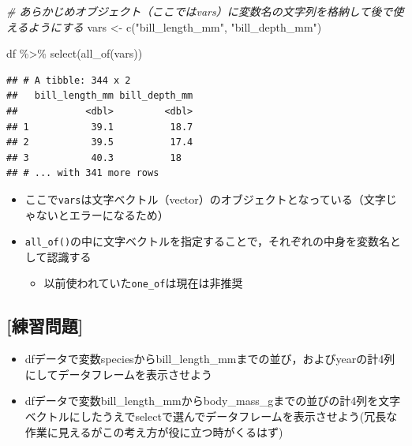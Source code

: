\documentclass[
  xelatex,ja=standard, b5paper]{bxjsbook}
\newenvironment{Shaded}{\begin{snugshade}}{\end{snugshade}}
\newcommand{\CommentTok}[1]{\textcolor[rgb]{0.56,0.35,0.01}{\textit{#1}}}
\newcommand{\FunctionTok}[1]{\textcolor[rgb]{0.00,0.00,0.00}{#1}}
\newcommand{\NormalTok}[1]{#1}
\newcommand{\OtherTok}[1]{\textcolor[rgb]{0.56,0.35,0.01}{#1}}
\newcommand{\SpecialCharTok}[1]{\textcolor[rgb]{0.00,0.00,0.00}{#1}}
\newcommand{\StringTok}[1]{\textcolor[rgb]{0.31,0.60,0.02}{#1}}
\providecommand{\tightlist}{%
  \setlength{\itemsep}{0pt}\setlength{\parskip}{0pt}}
\begin{document}
\begin{Shaded}
\begin{Highlighting}[]
\CommentTok{\# あらかじめオブジェクト（ここではvars）に変数名の文字列を格納して後で使えるようにする}
\NormalTok{vars }\OtherTok{\textless{}{-}} \FunctionTok{c}\NormalTok{(}\StringTok{"bill\_length\_mm"}\NormalTok{, }\StringTok{"bill\_depth\_mm"}\NormalTok{)}

\NormalTok{df }\SpecialCharTok{\%\textgreater{}\%} 
  \FunctionTok{select}\NormalTok{(}\FunctionTok{all\_of}\NormalTok{(vars))}
\end{Highlighting}
\end{Shaded}

\begin{verbatim}
## # A tibble: 344 x 2
##   bill_length_mm bill_depth_mm
##            <dbl>         <dbl>
## 1           39.1          18.7
## 2           39.5          17.4
## 3           40.3          18  
## # ... with 341 more rows
\end{verbatim}

\begin{itemize}
\tightlist
\item
  ここで\texttt{vars}は文字ベクトル（vector）のオブジェクトとなっている（文字じゃないとエラーになるため）
\item
  \texttt{all\_of()}の中に文字ベクトルを指定することで，それぞれの中身を変数名として認識する

  \begin{itemize}
  \tightlist
  \item
    以前使われていた\texttt{one\_of}は現在は非推奨
  \end{itemize}
\end{itemize}

\hypertarget{ux7df4ux7fd2ux554fux984c}{%
\subsection{{[}練習問題{]}}\label{ux7df4ux7fd2ux554fux984c}}

\begin{itemize}
\item
  dfデータで変数speciesからbill\_length\_mmまでの並び，およびyearの計4列にしてデータフレームを表示させよう
\item
  dfデータで変数bill\_length\_mmからbody\_mass\_gまでの並びの計4列を文字ベクトルにしたうえでselectで選んでデータフレームを表示させよう(冗長な作業に見えるがこの考え方が役に立つ時がくるはず)
\end{itemize}
\end{document}
